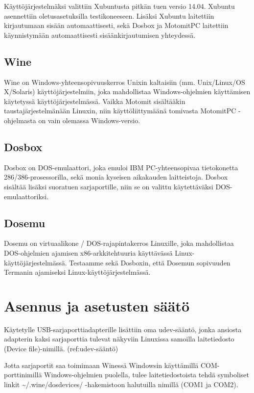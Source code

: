 \documentclass[11pt,a4paper,oneside,article]{memoir}
\begin{document}
Käyttöjärjestelmäksi valittiin Xubuntusta pitkän tuen versio 14.04.
Xubuntu asennettiin oletusasetuksilla testikoneeseen. Lisäksi Xubuntu
laitettiin kirjautumaan sisään automaattisesti, sekä Dosbox ja MotomitPC
laitettiin käynnistymään automaattisesti sisäänkirjautumisen yhteydessä.


\subsection{Wine}

Wine on Windows-yhteensopivuuskerros Unixin kaltaisiin (mm.
Unix/Linux/OS X/Solaris) käyttöjärjestelmiin, joka mahdollistaa
Windows-ohjelmien käyttämisen käytetyssä käyttöjärjestelmässä. Vaikka
Motomit sisältääkin taustajärjestelmänään
Linuxin\cite{motomit:manual}, niin käyttöliittymäänä tomivasta
MotomitPC -ohjelmasta on vain olemassa Windows-versio.

\subsection{Dosbox}

Dosbox on DOS-emulaattori, joka emuloi IBM PC-yhteensopivaa tietokonetta
286/386-prosessorilla, sekä monia kyseisen aikakauden laitteistoja.
Dosbox sisältää lisäksi suoratuen sarjaportille, niin se on valittu
käytettäväksi DOS-emulaattoriksi.

\subsection{Dosemu}
Dosemu on virtuaalikone / DOS-rajapintakerros Linuxille, joka mahdollistaa DOS-ohjelmien ajamisen x86-arkkitehtuuria käyttävässä Linux-käyttöjärjestelmässä. Testaamme sekä Dosboxin, että Dosemun sopivuuden Termanin ajamiseksi Linux-käyttöjärjestelmässä.

\section{Asennus ja asetusten säätö}
Käytetylle USB-sarjaporttiadapterille lisättiin oma udev-sääntö, jonka
ansiosta adapterin kaksi sarjaporttia tulevat näkyviin Linuxissa
samoilla laitetiedosto (Device file)-nimillä. (ref:udev-sääntö)

Jotta sarjaportit saa toimimaan Winessä Windowsin käyttämillä COM-porttinimillä
Windows-ohjelmien puolella, tulee laitetiedostoista tehdä symboliset
linkit \textasciitilde{}/.wine/dosdevices/ -hakemistoon halutuilla
nimillä (COM1 ja COM2).\cite[s. 21]{wine:manual}
\end{document}
